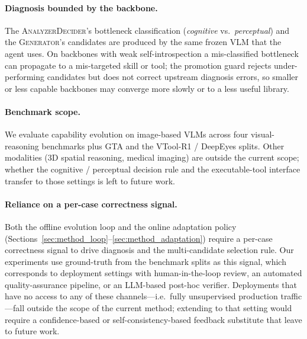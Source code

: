 \label{sec:limitations}

\paragraph{Diagnosis bounded by the backbone.}
The \textsc{AnalyzerDecider}'s bottleneck classification (\emph{cognitive} vs.\
\emph{perceptual}) and the \textsc{Generator}'s candidates are produced by the same frozen
VLM that the agent uses. On backbones with weak self-introspection a mis-classified
bottleneck can propagate to a mis-targeted skill or tool; the promotion guard rejects
under-performing candidates but does not correct upstream diagnosis errors, so smaller or
less capable backbones may converge more slowly or to a less useful library.

\paragraph{Benchmark scope.}
We evaluate capability evolution on image-based VLMs across four visual-reasoning
benchmarks plus GTA and the VTool-R1 / DeepEyes splits. Other modalities
(3D spatial reasoning, medical imaging) are outside the current scope; whether the
cognitive / perceptual decision rule and the executable-tool interface transfer to those
settings is left to future work.

\paragraph{Reliance on a per-case correctness signal.}
Both the offline evolution loop and the online adaptation policy
(Sections~\ref{sec:method_loop}--\ref{sec:method_adaptation}) require a per-case
correctness signal to drive diagnosis and the multi-candidate selection rule. Our
experiments use ground-truth from the benchmark splits as this signal, which
corresponds to deployment settings with human-in-the-loop review, an automated
quality-assurance pipeline, or an LLM-based post-hoc verifier. Deployments that have no
access to any of these channels---i.e.\ fully unsupervised production traffic---fall
outside the scope of the current method; extending \sysname{} to that setting would
require a confidence-based or self-consistency-based feedback substitute that leave
to future work.
